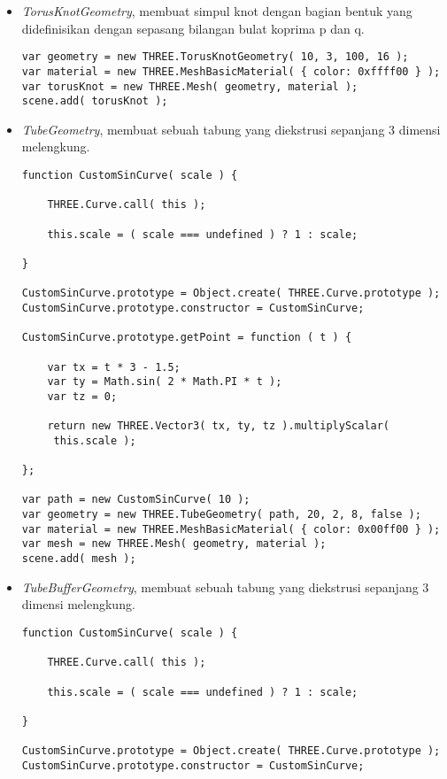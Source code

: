 \begin{itemize}
\begin{itemize}
	\item {\it TorusKnotGeometry}, membuat simpul knot dengan bagian bentuk yang didefinisikan dengan sepasang bilangan bulat koprima p dan q. 
	
\begin{lstlisting}
var geometry = new THREE.TorusKnotGeometry( 10, 3, 100, 16 );
var material = new THREE.MeshBasicMaterial( { color: 0xffff00 } );
var torusKnot = new THREE.Mesh( geometry, material );
scene.add( torusKnot );
\end{lstlisting}

	\item {\it TubeGeometry}, membuat sebuah tabung yang diekstrusi sepanjang 3 dimensi melengkung.
	
\begin{lstlisting}
function CustomSinCurve( scale ) {

	THREE.Curve.call( this );

	this.scale = ( scale === undefined ) ? 1 : scale;

}

CustomSinCurve.prototype = Object.create( THREE.Curve.prototype );
CustomSinCurve.prototype.constructor = CustomSinCurve;

CustomSinCurve.prototype.getPoint = function ( t ) {

	var tx = t * 3 - 1.5;
	var ty = Math.sin( 2 * Math.PI * t );
	var tz = 0;

	return new THREE.Vector3( tx, ty, tz ).multiplyScalar(
	 this.scale );

};

var path = new CustomSinCurve( 10 );
var geometry = new THREE.TubeGeometry( path, 20, 2, 8, false );
var material = new THREE.MeshBasicMaterial( { color: 0x00ff00 } );
var mesh = new THREE.Mesh( geometry, material );
scene.add( mesh );
\end{lstlisting}

	\item {\it TubeBufferGeometry},  membuat sebuah tabung yang diekstrusi sepanjang 3 dimensi melengkung.
	
\begin{lstlisting}
function CustomSinCurve( scale ) {

	THREE.Curve.call( this );

	this.scale = ( scale === undefined ) ? 1 : scale;

}

CustomSinCurve.prototype = Object.create( THREE.Curve.prototype );
CustomSinCurve.prototype.constructor = CustomSinCurve;


\end{lstlisting}
\end{itemize}
\end{itemize}
